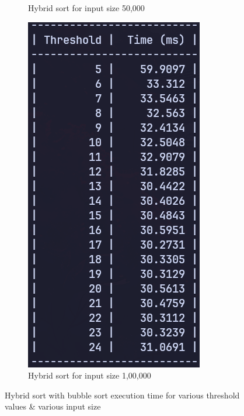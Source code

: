 \begin{figure}[H]
\begin{subfigure}[t]{0.4\textwidth}
        \caption{Hybrid sort for input size 50,000}
    \end{subfigure}
    \hfill
    \begin{subfigure}[t]{0.4\textwidth}
        \centering
        \includegraphics[scale=0.4]{img/task4/hb-1lac.png}
        \caption{Hybrid sort for input size 1,00,000}
    \end{subfigure}
    \caption{Hybrid sort with bubble sort execution time for various threshold values \&
    various input size}
    \label{fig:task3}
\end{figure}
